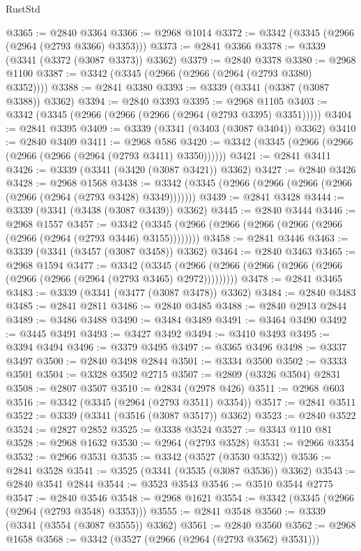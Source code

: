 \begin{lexlean}{RustStd}
\begin{coremodule}
@3365 := @2840 @3364
@3366 := @2968 @1014
@3372 := @3342 (@3345 (@2966 (@2964 (@2793 @3366) @3353)))
@3373 := @2841 @3366
@3378 := @3339 (@3341 (@3372 (@3087 @3373)) @3362)
@3379 := @2840 @3378
@3380 := @2968 @1100
@3387 := @3342 (@3345 (@2966 (@2966 (@2964 (@2793 @3380) @3352))))
@3388 := @2841 @3380
@3393 := @3339 (@3341 (@3387 (@3087 @3388)) @3362)
@3394 := @2840 @3393
@3395 := @2968 @1105
@3403 := @3342 (@3345 (@2966 (@2966 (@2966 (@2964 (@2793 @3395) @3351)))))
@3404 := @2841 @3395
@3409 := @3339 (@3341 (@3403 (@3087 @3404)) @3362)
@3410 := @2840 @3409
@3411 := @2968 @586
@3420 := @3342 (@3345 (@2966 (@2966 (@2966 (@2966 (@2964 (@2793 @3411) @3350))))))
@3421 := @2841 @3411
@3426 := @3339 (@3341 (@3420 (@3087 @3421)) @3362)
@3427 := @2840 @3426
@3428 := @2968 @1568
@3438 := @3342 (@3345 (@2966 (@2966 (@2966 (@2966 (@2966 (@2964 (@2793 @3428) @3349)))))))
@3439 := @2841 @3428
@3444 := @3339 (@3341 (@3438 (@3087 @3439)) @3362)
@3445 := @2840 @3444
@3446 := @2968 @1557
@3457 := @3342 (@3345 (@2966 (@2966 (@2966 (@2966 (@2966 (@2966 (@2964 (@2793 @3446) @3155))))))))
@3458 := @2841 @3446
@3463 := @3339 (@3341 (@3457 (@3087 @3458)) @3362)
@3464 := @2840 @3463
@3465 := @2968 @1594
@3477 := @3342
    (@3345 (@2966 (@2966 (@2966 (@2966 (@2966 (@2966 (@2966 (@2964 (@2793 @3465) @2972)))))))))
@3478 := @2841 @3465
@3483 := @3339 (@3341 (@3477 (@3087 @3478)) @3362)
@3484 := @2840 @3483
@3485 := @2841 @2811
@3486 := @2840 @3485
@3488 := @2840 @2913 @2844
@3489 := @3486 @3488
@3490 := @3484 @3489
@3491 := @3464 @3490
@3492 := @3445 @3491
@3493 := @3427 @3492
@3494 := @3410 @3493
@3495 := @3394 @3494
@3496 := @3379 @3495
@3497 := @3365 @3496
@3498 := @3337 @3497
@3500 := @2840 @3498 @2844
@3501 := @3334 @3500
@3502 := @3333 @3501
@3504 := @3328 @3502 @2715
@3507 := @2809 (@3326 @3504) @2831
@3508 := @2807 @3507
@3510 := @2834 (@2978 @426)
@3511 := @2968 @603
@3516 := @3342 (@3345 (@2964 (@2793 @3511) @3354))
@3517 := @2841 @3511
@3522 := @3339 (@3341 (@3516 (@3087 @3517)) @3362)
@3523 := @2840 @3522
@3524 := @2827 @2852
@3525 := @3338 @3524
@3527 := @3343 @110 @81
@3528 := @2968 @1632
@3530 := @2964 (@2793 @3528)
@3531 := @2966 @3354
@3532 := @2966 @3531
@3535 := @3342 (@3527 (@3530 @3532))
@3536 := @2841 @3528
@3541 := @3525 (@3341 (@3535 (@3087 @3536)) @3362)
@3543 := @2840 @3541 @2844
@3544 := @3523 @3543
@3546 := @3510 @3544 @2775
@3547 := @2840 @3546
@3548 := @2968 @1621
@3554 := @3342 (@3345 (@2966 (@2964 (@2793 @3548) @3353)))
@3555 := @2841 @3548
@3560 := @3339 (@3341 (@3554 (@3087 @3555)) @3362)
@3561 := @2840 @3560
@3562 := @2968 @1658
@3568 := @3342 (@3527 (@2966 (@2964 (@2793 @3562) @3531)))

\end{coremodule}
\end{lexlean}
